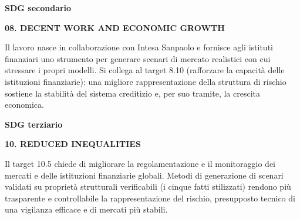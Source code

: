 \documentclass[11pt,a4paper]{article}
\newcommand{\camposdg}[2]{%
  \par\noindent\parbox[t]{0.22\textwidth}{\raggedright\bfseries #1}%
  \parbox[t]{0.76\textwidth}{\raggedright #2}\par\medskip}
\begin{document}
\vspace{1.2em}

\camposdg{SDG secondario}{\textbf{08. DECENT WORK AND ECONOMIC GROWTH}}

\noindent\small Il lavoro nasce in collaborazione con Intesa Sanpaolo e
fornisce agli istituti finanziari uno strumento per generare scenari di
mercato realistici con cui stressare i propri modelli. Si collega al target
8.10 (rafforzare la capacità delle istituzioni finanziarie): una migliore
rappresentazione della struttura di rischio sostiene la stabilità del sistema
creditizio e, per suo tramite, la crescita economica.\normalsize

\vspace{1.2em}

\camposdg{SDG terziario}{\textbf{10. REDUCED INEQUALITIES}}

\noindent\small Il target 10.5 chiede di migliorare la regolamentazione e il
monitoraggio dei mercati e delle istituzioni finanziarie globali. Metodi di
generazione di scenari validati su proprietà strutturali verificabili (i
cinque fatti stilizzati) rendono più trasparente e controllabile la
rappresentazione del rischio, presupposto tecnico di una vigilanza efficace e
di mercati più stabili.\normalsize
\end{document}
